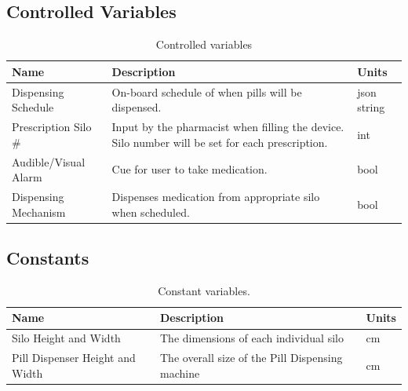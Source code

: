 \documentclass[12pt,titlepage]{article}
\begin{document}
\subsection{Controlled Variables}
\begin{table}[ht!]
\begin{center}
\begin{adjustbox}{max width=\textwidth}
\small
\begin{tabular}{|p{}|p{}|p{}|}
 \hline
 \textbf{Name} & \textbf{Description} & \textbf{Units}\\
 \hline 
Dispensing Schedule & On-board schedule of when pills will be dispensed. & json string \\
 \hline
Prescription Silo \# & Input by the pharmacist when filling the device. Silo number will be set for each prescription. & int \\
 \hline
 Audible/Visual Alarm & Cue for user to take medication. & bool \\
 \hline
 Dispensing Mechanism & Dispenses medication from appropriate silo when scheduled. & bool\\
 \hline
\end{tabular}
\end{adjustbox}
\end{center}
\caption{Controlled variables}
\end{table}

\subsection{Constants}
\begin{table}[ht!]
\begin{center}
\begin{adjustbox}{max width=\textwidth}
\small
\begin{tabular}{|p{}|p{}|p{}|}
 \hline
 \textbf{Name} & \textbf{Description} & \textbf{Units}\\
 \hline 
 Silo Height and Width & The dimensions of each individual silo & cm\\
 \hline
 Pill Dispenser Height and Width & The overall size of the Pill Dispensing machine & cm\\
 \hline
\end{tabular}
\end{adjustbox}
\end{center}
\caption{Constant variables.}
\end{table}
\end{document}
